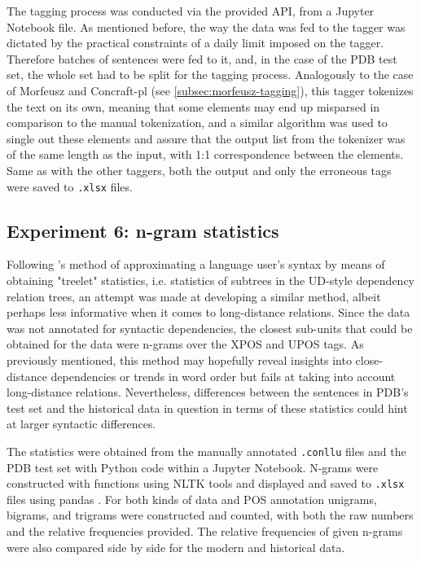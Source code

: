 The tagging process was conducted via the provided API, from a Jupyter Notebook file. As mentioned before, the way the data was fed to the tagger was dictated by the practical constraints of a daily limit imposed on the tagger. Therefore batches of sentences were fed to it, and, in the case of the PDB test set, the whole set had to be split for the tagging process. Analogously to the case of Morfeusz and Concraft-pl (see \autoref{subsec:morfeusz-tagging}), this tagger tokenizes the text on its own, meaning that some elements may end up misparsed in comparison to the manual tokenization, and a similar algorithm was used to single out these elements and assure that the output list from the tokenizer was of the same length as the input, with 1:1 correspondence between the elements. Same as with the other taggers, both the output and only the erroneous tags were saved to \texttt{.xlsx} files.

\subsection{Experiment 6: n-gram statistics}
\label{subsec:ngrams}

Following \citet{johannsen-etal-2015-cross}'s method of approximating a language user's syntax by means of obtaining "treelet" statistics, i.e. statistics of subtrees in the UD-style dependency relation trees, an attempt was made at developing a similar method, albeit perhaps less informative when it comes to long-distance relations. Since the data was not annotated for syntactic dependencies, the closest sub-units that could be obtained for the data were n-grams over the XPOS and UPOS tags. As previously mentioned, this method may hopefully reveal insights into close-distance dependencies or trends in word order but fails at taking into account long-distance relations. Nevertheless, differences between the sentences in PDB's test set and the historical data in question in terms of these statistics could hint at larger syntactic differences.

The statistics were obtained from the manually annotated \texttt{.conllu} files and the PDB test set with Python code within a Jupyter Notebook. N-grams were constructed with functions using NLTK tools and displayed and saved to \texttt{.xlsx} files using pandas \citep{bird_loper_klein_2009, reback2020pandas, mckinney-proc-scipy-2010}. For both kinds of data and POS annotation unigrams, bigrams, and trigrams were constructed and counted, with both the raw numbers and the relative frequencies provided. The relative frequencies of given n-grams were also compared side by side for the modern and historical data.

